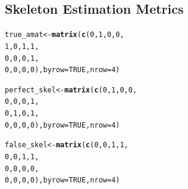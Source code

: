 \documentclass[12pt]{article}\usepackage[]{graphicx}\usepackage[]{color}
\makeatletter
\newcommand{\hlnum}[1]{\textcolor[rgb]{0.686,0.059,0.569}{#1}}%
\newcommand{\hlstd}[1]{\textcolor[rgb]{0.345,0.345,0.345}{#1}}%
\newcommand{\hlkwb}[1]{\textcolor[rgb]{0.69,0.353,0.396}{#1}}%
\newcommand{\hlkwc}[1]{\textcolor[rgb]{0.333,0.667,0.333}{#1}}%
\newcommand{\hlkwd}[1]{\textcolor[rgb]{0.737,0.353,0.396}{\textbf{#1}}}%
\newenvironment{kframe}{%
 \def\at@end@of@kframe{}%
 \ifinner\ifhmode%
  \def\at@end@of@kframe{\end{minipage}}%
  \begin{minipage}{\columnwidth}%
 \fi\fi%
 \def\FrameCommand##1{\hskip\@totalleftmargin \hskip-\fboxsep
 \colorbox{shadecolor}{##1}\hskip-\fboxsep
     \hskip-\linewidth \hskip-\@totalleftmargin \hskip\columnwidth}%
 \MakeFramed {\advance\hsize-\width
   \@totalleftmargin\z@ \linewidth\hsize
   \@setminipage}}%
 {\par\unskip\endMakeFramed%
 \at@end@of@kframe}
\newenvironment{knitrout}{}{} %
\makeatother
\begin{document}
\subsection*{Skeleton Estimation Metrics}
\begin{knitrout}
\color{fgcolor}\begin{kframe}
\begin{alltt}
\hlstd{true_amat} \hlkwb{<-} \hlkwd{matrix}\hlstd{(}\hlkwd{c}\hlstd{(}\hlnum{0}\hlstd{,}\hlnum{1}\hlstd{,}\hlnum{0}\hlstd{,}\hlnum{0}\hlstd{,}
                      \hlnum{1}\hlstd{,}\hlnum{0}\hlstd{,}\hlnum{1}\hlstd{,}\hlnum{1}\hlstd{,}
                      \hlnum{0}\hlstd{,}\hlnum{0}\hlstd{,}\hlnum{0}\hlstd{,}\hlnum{1}\hlstd{,}
                      \hlnum{0}\hlstd{,}\hlnum{0}\hlstd{,}\hlnum{0}\hlstd{,}\hlnum{0}\hlstd{),}\hlkwc{byrow} \hlstd{=} \hlnum{TRUE}\hlstd{,}\hlkwc{nrow} \hlstd{=} \hlnum{4}\hlstd{)}

\hlstd{perfect_skel} \hlkwb{<-} \hlkwd{matrix}\hlstd{(}\hlkwd{c}\hlstd{(}\hlnum{0}\hlstd{,}\hlnum{1}\hlstd{,}\hlnum{0}\hlstd{,}\hlnum{0}\hlstd{,}
                         \hlnum{0}\hlstd{,}\hlnum{0}\hlstd{,}\hlnum{0}\hlstd{,}\hlnum{1}\hlstd{,}
                         \hlnum{0}\hlstd{,}\hlnum{1}\hlstd{,}\hlnum{0}\hlstd{,}\hlnum{1}\hlstd{,}
                         \hlnum{0}\hlstd{,}\hlnum{0}\hlstd{,}\hlnum{0}\hlstd{,}\hlnum{0}\hlstd{),}\hlkwc{byrow} \hlstd{=} \hlnum{TRUE}\hlstd{,}\hlkwc{nrow} \hlstd{=} \hlnum{4}\hlstd{)}

\hlstd{false_skel} \hlkwb{<-} \hlkwd{matrix}\hlstd{(}\hlkwd{c}\hlstd{(}\hlnum{0}\hlstd{,}\hlnum{0}\hlstd{,}\hlnum{1}\hlstd{,}\hlnum{1}\hlstd{,}
                       \hlnum{0}\hlstd{,}\hlnum{0}\hlstd{,}\hlnum{1}\hlstd{,}\hlnum{1}\hlstd{,}
                       \hlnum{0}\hlstd{,}\hlnum{0}\hlstd{,}\hlnum{0}\hlstd{,}\hlnum{0}\hlstd{,}
                       \hlnum{0}\hlstd{,}\hlnum{0}\hlstd{,}\hlnum{0}\hlstd{,}\hlnum{0}\hlstd{),}\hlkwc{byrow} \hlstd{=} \hlnum{TRUE}\hlstd{,}\hlkwc{nrow} \hlstd{=} \hlnum{4}\hlstd{)}
\end{alltt}
\end{kframe}
\end{knitrout}
\end{document}
